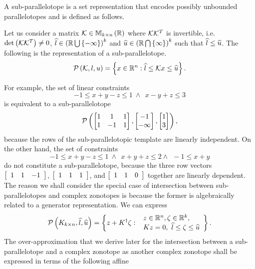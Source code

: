 A sub-parallelotope is a set representation that encodes possibly
unbounded parallelotopes and is defined as follows.
%
\begin{definition}
Let us consider a matrix $\mathcal{K}\in\mathbb{M}_{k\times n}\left(\mathbb{R}\right)$ where
$\mathcal{K}{\mathcal{K}}^T$ is invertible,
i.e. $\operatorname{det}\left(\mathcal{K}{\mathcal{K}}^T\right)\neq 0$,
$\widehat{l}\in\left(\mathbb{R}\bigcup\left\{-\infty\right\}\right)^k$ and
$\widehat{u}\in\left(\mathbb{R}\bigcap\left\{\infty\right\}\right)^k$ such that $\widehat{l}\leq\widehat{u}$.
The following is the representation of a sub-parallelotope.
%
\[
\mathcal{P}\left(\mathcal{K},l,u\right) = \left\{x\in\mathbb{R}^n: \widehat{l}\leq\mathcal{K} x\leq\widehat{u}\right\}.
\]
%
\end{definition}
%
For example, the set of linear constraints
%
\[ -1\leq x+y-z\leq
1~\wedge~~ x-y+z\leq 3\]
%
is equivalent to a sub-parallelotope
$$\mathcal{P}\left(\left[\begin{matrix}1 & 1 & 1\\1 &-1 & 1\end{matrix}\right],\left[\begin{matrix}-1\\-\infty\end{matrix}\right],\left[\begin{matrix}1\\3\end{matrix}\right]\right),$$
because the rows of the sub-parallelotopic template are linearly
independent.  On the other hand, the set of constraints
%
\[
-1\leq
x+y-z\leq 1~\wedge~~x+y+z\leq 2\wedge~~-1\leq x+y
\]
%
do not constitute a sub-parallelotope, because the three row vectors
$\left[\begin{array}{c c c}1 & 1 & -1\end{array}\right]$,
$\left[\begin{array}{c c c}1 & 1 & 1\end{array}\right]$, and
$\left[\begin{array}{c c c}1 & 1 & 0\end{array}\right]$ together are
linearly dependent.  The reason we shall consider the special case of
intersection between sub-parallelotopes and complex zonotopes is
because the former is algebraically related to a generator
representation.  We can express %
\[
\mathcal{P}\left(K_{k\times
    n},\widehat{l},\widehat{u}\right)=\left\{z+{K}^\dagger\zeta:\begin{array}{l}~z\in\mathbb{R}^n,\zeta\in\mathbb{R}^k,
  \\~Kz=0,~\widehat{l}\leq
\zeta\leq \widehat{u}\end{array}\right\}.
\]
%
The over-approximation that we derive later for the intersection
between a sub-parallelotope and a complex zonotope as another complex
zonotope shall be expressed in terms of the following affine
